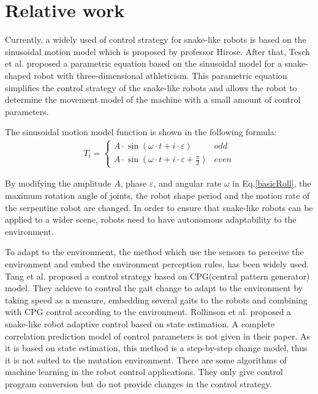 \section{Relative work}
Currently, a widely used of control strategy for snake-like robots is based on the sinusoidal motion model\cite{HiroseSine} which is proposed by professor Hirose. After that, Tesch et al. proposed a parametric equation based on the sinusoidal model for a snake-shaped robot with three-dimensional athleticism\cite{ChosetSine}. This parametric equation simplifies the control strategy of the snake-like robots and allows the robot to determine the movement model of the machine with a small amount of control parameters.

The sinusoidal motion model function is shown in the following formula:
\begin{eqnarray}\label{basicRoll}
T_i=\left\{
\begin{array}{lr}
A\cdot \sin (\omega \cdot t + i\cdot \varepsilon )&odd\\
A\cdot \sin (\omega \cdot t + i\cdot \varepsilon +  \frac{\pi}{2})&even
\end{array}
\right.
\end{eqnarray}

By modifying the amplitude $A$, phase $\varepsilon$, and angular rate $\omega$ in Eq.\ref{basicRoll}, the maximum rotation angle of joints, the robot shape period and the motion rate of the serpentine robot are changed. In order to ensure that snake-like robots can be applied to a wider scene, robots need to have autonomous adaptability to the environment.

To adapt to the environment, the method which use the sensors to perceive the environment and embed the environment perception rules, has been widely used\cite{CPGenabling}\cite{GaitBasedCompliant}\cite{BalancingAndControl}\cite{FeedbackControlOfSoft}. Tang et al. proposed a control strategy based on CPG(central pattern generator) model\cite{CPGenabling}. They achieve to control the gait change to adapt to the environment by taking speed as a measure,  embedding several gaits to the robots and combining with CPG control according to the environment. Rollinson et al. proposed a snake-like robot adaptive control based on state estimation\cite{GaitBasedCompliant}. A complete correlation prediction model of control parameters is not given in their paper. As it is based on state estimation, this method is a step-by-step change model, thus it is not suited to the mutation environment. There are some algorithms of machine learning in the robot control applications\cite{InformationDriven}\cite{NovelPlasticityRule}\cite{MissileSystems}\cite{NeuroFuzzyBayesian}. They only give control program conversion but do not provide changes in the control strategy.

